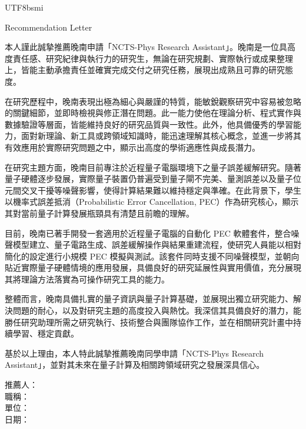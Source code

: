 \documentclass[12pt]{article}
\begin{document}
\begin{CJK}{UTF8}{bsmi}
\onehalfspacing

\begin{center}
{\LARGE Recommendation Letter}
\end{center}

\vspace{1em}

\noindent 本人謹此誠摯推薦晚南申請「NCTS-Phys Research Assistant」。晚南是一位具高度責任感、研究紀律與執行力的研究生，無論在研究規劃、實際執行或成果整理上，皆能主動承擔責任並確實完成交付之研究任務，展現出成熟且可靠的研究態度。

\noindent 在研究歷程中，晚南表現出極為細心與嚴謹的特質，能敏銳觀察研究中容易被忽略的關鍵細節，並即時檢視與修正潛在問題。此一能力使他在理論分析、程式實作與數據驗證等層面，皆能維持良好的研究品質與一致性。此外，他具備優秀的學習能力，面對新理論、新工具或跨領域知識時，能迅速理解其核心概念，並進一步將其有效應用於實際研究問題之中，顯示出高度的學術適應性與成長潛力。

\noindent 在研究主題方面，晚南目前專注於近程量子電腦環境下之量子誤差緩解研究。隨著量子硬體逐步發展，實際量子裝置仍普遍受到量子閘不完美、量測誤差以及量子位元間交叉干擾等噪聲影響，使得計算結果難以維持穩定與準確。在此背景下，學生以機率式誤差抵消（Probabilistic Error Cancellation, PEC）作為研究核心，顯示其對當前量子計算發展瓶頸具有清楚且前瞻的理解。

\noindent 目前，晚南已著手開發一套適用於近程量子電腦的自動化 PEC 軟體套件，整合噪聲模型建立、量子電路生成、誤差緩解操作與結果重建流程，使研究人員能以相對簡化的設定進行小規模 PEC 模擬與測試。該套件同時支援不同噪聲模型，並朝向貼近實際量子硬體情境的應用發展，具備良好的研究延展性與實用價值，充分展現其將理論方法落實為可操作研究工具的能力。

\noindent 整體而言，晚南具備扎實的量子資訊與量子計算基礎，並展現出獨立研究能力、解決問題的耐心，以及對研究主題的高度投入與熱忱。我深信其具備良好的潛力，能勝任研究助理所需之研究執行、技術整合與團隊協作工作，並在相關研究計畫中持續學習、穩定貢獻。

\noindent 基於以上理由，本人特此誠摯推薦晚南同學申請「NCTS-Phys Research Assistant」，並對其未來在量子計算及相關跨領域研究之發展深具信心。

\vspace{2cm}

\noindent 推薦人：\underline{\hspace{4cm}}\\[0.6cm]
\noindent 職稱：\underline{\hspace{4cm}}\\[0.6cm]
\noindent 單位：\underline{\hspace{6cm}}\\[0.6cm]
\noindent 日期：\underline{\hspace{4cm}}

\end{CJK}
\end{document}

